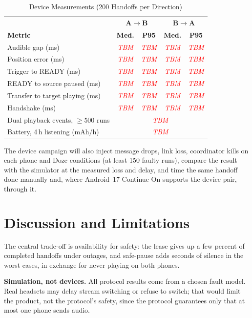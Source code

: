 \documentclass[conference]{IEEEtran}
\newcommand{\tbm}{\textcolor{red}{\textit{TBM}}}
\begin{document}
\begin{table}[t]
\caption{Device Measurements (200 Handoffs per Direction)}
\label{tab:hw}
\centering
\footnotesize
\begin{tabular}{@{}lcccc@{}}
\toprule
 & \multicolumn{2}{c}{\textbf{A$\to$B}} & \multicolumn{2}{c}{\textbf{B$\to$A}} \\
\textbf{Metric} & \textbf{Med.} & \textbf{P95} & \textbf{Med.} & \textbf{P95} \\
\midrule
Audible gap (ms) & \tbm & \tbm & \tbm & \tbm \\
Position error (ms) & \tbm & \tbm & \tbm & \tbm \\
Trigger to READY (ms) & \tbm & \tbm & \tbm & \tbm \\
READY to source paused (ms) & \tbm & \tbm & \tbm & \tbm \\
Transfer to target playing (ms) & \tbm & \tbm & \tbm & \tbm \\
Handshake (ms) & \tbm & \tbm & \tbm & \tbm \\
\midrule
Dual playback events, $\ge$500 runs & \multicolumn{4}{c}{\tbm} \\
Battery, 4\,h listening (mAh/h) & \multicolumn{4}{c}{\tbm} \\
\bottomrule
\end{tabular}
\end{table}

The device campaign will also inject message drops, link loss, coordinator kills on each phone and Doze conditions (at least 150 faulty runs), compare the result with the simulator at the measured loss and delay, and time the same handoff done manually and, where Android~17 Continue On supports the device pair, through it.

\section{Discussion and Limitations}

The central trade-off is availability for safety: the lease gives up a few percent of completed handoffs under outages, and safe-pause adds seconds of silence in the worst cases, in exchange for never playing on both phones.

\textbf{Simulation, not devices.} All protocol results come from a chosen fault model. Real headsets may delay stream switching or refuse to switch; that would limit the product, not the protocol's safety, since the protocol guarantees only that at most one phone sends audio.
\end{document}
